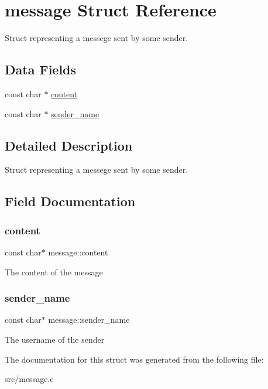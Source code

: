 \hypertarget{structmessage}{}\section{message Struct Reference}
\label{structmessage}


Struct representing a messege sent by some sender.  


\subsection*{Data Fields}
\begin{DoxyCompactItemize}
\item 
const char $\ast$ \hyperlink{structmessage_ad3b965525fe62cb25162084d97a3f0ff}{content}
\item 
const char $\ast$ \hyperlink{structmessage_a93d4525b657c15744e45ca9504840000}{sender\+\_\+name}
\end{DoxyCompactItemize}


\subsection{Detailed Description}
Struct representing a messege sent by some sender. 

\subsection{Field Documentation}
\mbox{\label{structmessage_ad3b965525fe62cb25162084d97a3f0ff}} 
\subsubsection{\texorpdfstring{content}{content}}
{\footnotesize\ttfamily const char$\ast$ message\+::content}

The content of the message \mbox{\label{structmessage_a93d4525b657c15744e45ca9504840000}} 
\subsubsection{\texorpdfstring{sender\+\_\+name}{sender\_name}}
{\footnotesize\ttfamily const char$\ast$ message\+::sender\+\_\+name}

The username of the sender 

The documentation for this struct was generated from the following file\+:\begin{DoxyCompactItemize}
\item 
src/message.\+c\end{DoxyCompactItemize}
